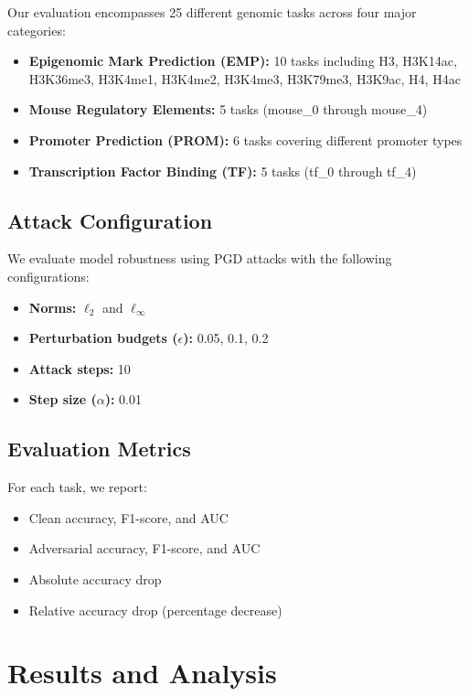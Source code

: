 \documentclass{article} %
\begin{document}
Our evaluation encompasses 25 different genomic tasks across four major categories:
\begin{itemize}
    \item \textbf{Epigenomic Mark Prediction (EMP):} 10 tasks including H3, H3K14ac, H3K36me3, H3K4me1, H3K4me2, H3K4me3, H3K79me3, H3K9ac, H4, H4ac
    \item \textbf{Mouse Regulatory Elements:} 5 tasks (mouse\_0 through mouse\_4)
    \item \textbf{Promoter Prediction (PROM):} 6 tasks covering different promoter types
    \item \textbf{Transcription Factor Binding (TF):} 5 tasks (tf\_0 through tf\_4)
\end{itemize}

\subsection{Attack Configuration}

We evaluate model robustness using PGD attacks with the following configurations:
\begin{itemize}
    \item \textbf{Norms:} $\ell_2$ and $\ell_\infty$
    \item \textbf{Perturbation budgets ($\epsilon$):} 0.05, 0.1, 0.2
    \item \textbf{Attack steps:} 10
    \item \textbf{Step size ($\alpha$):} 0.01
\end{itemize}

\subsection{Evaluation Metrics}

For each task, we report:
\begin{itemize}
    \item Clean accuracy, F1-score, and AUC
    \item Adversarial accuracy, F1-score, and AUC
    \item Absolute accuracy drop
    \item Relative accuracy drop (percentage decrease)
\end{itemize}

\section{Results and Analysis}
\end{document}
